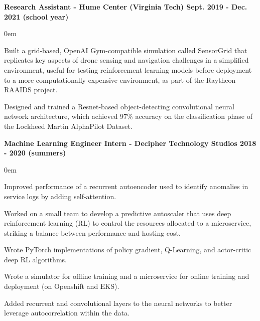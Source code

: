 \documentclass{article}
\begin{document}
\begin{center}
\begin{flushleft}
    \textbf{Research Assistant - Hume Center (Virginia Tech) \hfill Sept. 2019 - Dec. 2021 (school year)}
    \begin{compactitem}
      \itemsep0em
      \item Built a grid-based, OpenAI Gym-compatible simulation called SensorGrid that replicates key aspects of drone sensing and navigation challenges in a simplified environment, useful for testing reinforcement learning models before deployment to a more computationally-expensive environment, as part of the Raytheon RAAIDS project. 
      \item Designed and trained a Resnet-based object-detecting convolutional neural network architecture, which achieved 97\% accuracy on the classification phase of the Lockheed Martin AlphaPilot Dataset. %
    \end{compactitem}

    \textbf{Machine Learning Engineer Intern - Decipher Technology Studios \hfill 2018 - 2020 (summers)}
    \begin{compactitem}
      \itemsep0em
      \item Improved performance of a recurrent autoencoder used to identify anomalies in service logs by adding self-attention.
      \item Worked on a small team to develop a predictive autoscaler that uses deep reinforcement learning (RL) to control the resources allocated to a microservice, striking a balance between performance and hosting cost.
      \item Wrote PyTorch implementations of policy gradient, Q-Learning, and actor-critic deep RL algorithms.%
      \item Wrote a simulator for offline training and a microservice for online training and deployment (on Openshift and EKS).
      \item Added recurrent and convolutional layers to the neural networks to better leverage autocorrelation within the data.
    \end{compactitem}


\end{flushleft}
\end{center}
\end{document}
